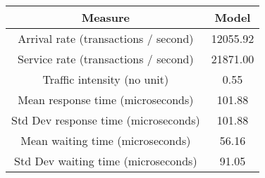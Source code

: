 \begin{tabular}{|c|c|}
\hline Measure & Model\\
\hline \hline Arrival rate (transactions / second) & 12055.92\\
\hline Service rate (transactions / second) & 21871.00\\
\hline Traffic intensity (no unit) & 0.55\\
\hline Mean response time (microseconds) & 101.88\\
\hline Std Dev response time (microseconds) & 101.88\\
\hline Mean waiting time (microseconds) & 56.16\\
\hline Std Dev waiting time (microseconds) & 91.05\\
\hline
\end{tabular}

